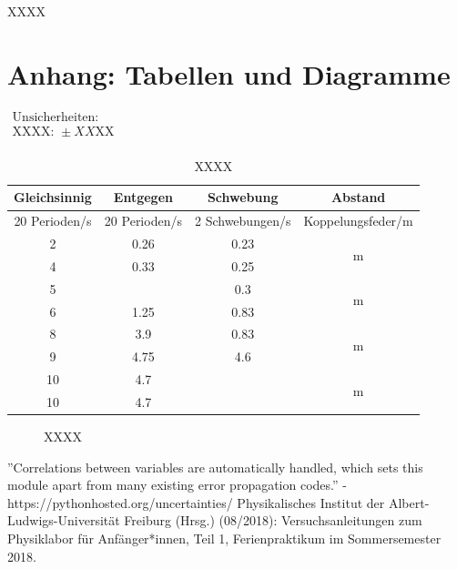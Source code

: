 \documentclass[11pt,a4paper]{article}
\begin{document}
XXXX

\pagebreak

\section{Anhang: Tabellen und Diagramme}

\begin{table}[h]
\centering
\caption{XXXX} \vspace{11pt}
$\begin{array}{l}
\textrm{Unsicherheiten:}\\
\textrm{XXXX: } \pm XX \textrm{XX}\\
\end{array}$
\begin{tabular}{cccc}
\textrm{Gleichsinnig} & \textrm{Entgegen} & \textrm{Schwebung} & \textrm{Abstand}\\
\toprule
\textrm{20 Perioden}/\textrm{s} & \textrm{20 Perioden}/\textrm{s} & \textrm{2 Schwebungen}/\textrm{s} & \textrm{Koppelungsfeder}/\textrm{m}\\
\midrule 
2 & 0.26 & 0.23 & \multirow{2}{*}{m}\\
4 & 0.33 & 0.25 &\\
\hline 
5 & & 0.3 & \multirow{2}{*}{m}\\
6 & 1.25 & 0.83 &\\
\hline 
8 & 3.9 & 0.83 & \multirow{2}{*}{m}\\ 
9 & 4.75 & 4.6 &\\ 
\hline
10 & 4.7 & & \multirow{2}{*}{m}\\
10 & 4.7 & &\\ 
\bottomrule
\end{tabular}
\label{Tab:X}
\end{table}

\begin{figure}[p]
\centering
{}
\renewcommand\thefigure{BX}
\caption[XXXX]{XXXX}
\label{Abb:X}
\end{figure}

\begin{thebibliography}{9}
''Correlations between variables are automatically handled, which sets this module apart from many existing error propagation codes.'' - https://pythonhosted.org/uncertainties/
 Physikalisches Institut der Albert-Ludwigs-Universität Freiburg (Hrsg.) (08/2018): Versuchsanleitungen zum Physiklabor für Anfänger*innen, Teil 1, Ferienpraktikum im Sommersemester 2018.
\end{thebibliography}
\end{document}
